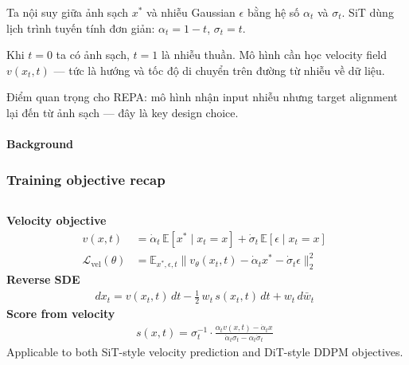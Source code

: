 \begin{frame}[t]
{    Ta nội suy giữa ảnh sạch $x^*$ và nhiễu Gaussian $\epsilon$ bằng
    hệ số $\alpha_t$ và $\sigma_t$. SiT dùng lịch trình tuyến tính
    đơn giản: $\alpha_t = 1 - t$, $\sigma_t = t$.

    Khi $t = 0$ ta có ảnh sạch, $t = 1$ là nhiễu thuần. Mô hình cần
    học velocity field $v(x_t, t)$ — tức là hướng và tốc độ di chuyển
    trên đường từ nhiễu về dữ liệu.

    Điểm quan trọng cho REPA: mô hình nhận input nhiễu nhưng target
    alignment lại đến từ ảnh sạch — đây là key design choice.
  }
\end{frame}

\begin{frame}[t]
  \framesubtitle{Background}
  \frametitle{Training objective recap}
  \begin{columns}[T,totalwidth=\textwidth]
    \textbf{Velocity objective}
    \begin{align*}
      v(x, t) &= \dot{\alpha}_t\,\mathbb{E}[x^\ast \mid x_t{=}x]
                 + \dot{\sigma}_t\,\mathbb{E}[\epsilon \mid x_t{=}x] \\[4pt]
      \mathcal{L}_{\text{vel}}(\theta)
      &= \mathbb{E}_{x^\ast,\epsilon,t}
      \bigl\|v_\theta(x_t, t) - \dot{\alpha}_t x^\ast
            - \dot{\sigma}_t \epsilon\bigr\|_2^2
    \end{align*}
    \vspace{0.08cm}
    \textbf{Reverse SDE}
    \begin{align*}
      dx_t = v(x_t, t)\,dt
             - \tfrac{1}{2}\,w_t\,s(x_t, t)\,dt
             + w_t\,d\bar{w}_t
    \end{align*}
    \textbf{Score from velocity}
    \begin{align*}
      s(x,t) = \sigma_t^{-1} \cdot
      \frac{\alpha_t v(x,t) - \dot{\alpha}_t x}
           {\dot{\alpha}_t \sigma_t - \alpha_t \dot{\sigma}_t}
    \end{align*}
    \vspace{0.16cm}
    \vspace{0.16cm}
    {\small Applicable to both SiT-style velocity prediction and
    DiT-style DDPM objectives.}
  \end{columns}
\end{frame}
